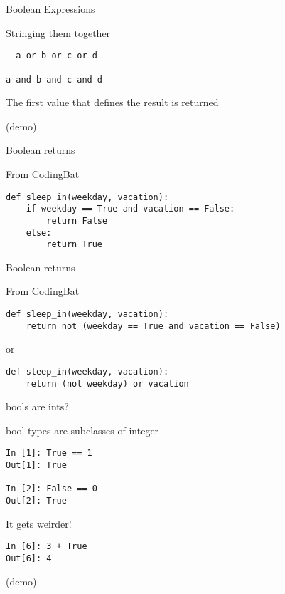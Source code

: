 \documentclass{beamer}
\begin{document}
\begin{frame}[fragile]{Boolean Expressions}

{\Large Stringing them together}

\begin{verbatim}
￼ a or b or c or d

a and b and c and d  
\end{verbatim}

{\Large The first value that defines the result is returned}

\vfill
(demo)
\end{frame}


\begin{frame}[fragile]{Boolean returns}

{\Large From CodingBat}
\vfill
\begin{verbatim}
def sleep_in(weekday, vacation):
    if weekday == True and vacation == False:
        return False
    else:
        return True
\end{verbatim}

\end{frame}


\begin{frame}[fragile]{Boolean returns}

{\Large From CodingBat}


\begin{verbatim}
def sleep_in(weekday, vacation):
    return not (weekday == True and vacation == False)
\end{verbatim}

or

\begin{verbatim}
def sleep_in(weekday, vacation):
    return (not weekday) or vacation
\end{verbatim}


\end{frame}


\begin{frame}[fragile]{bools are ints?}

{\Large bool types are subclasses of integer}

\begin{verbatim}
In [1]: True == 1
Out[1]: True

In [2]: False == 0
Out[2]: True  
\end{verbatim}

{\Large It gets weirder! }

\begin{verbatim}
In [6]: 3 + True
Out[6]: 4
\end{verbatim}

(demo)

\end{frame}
\end{document}
